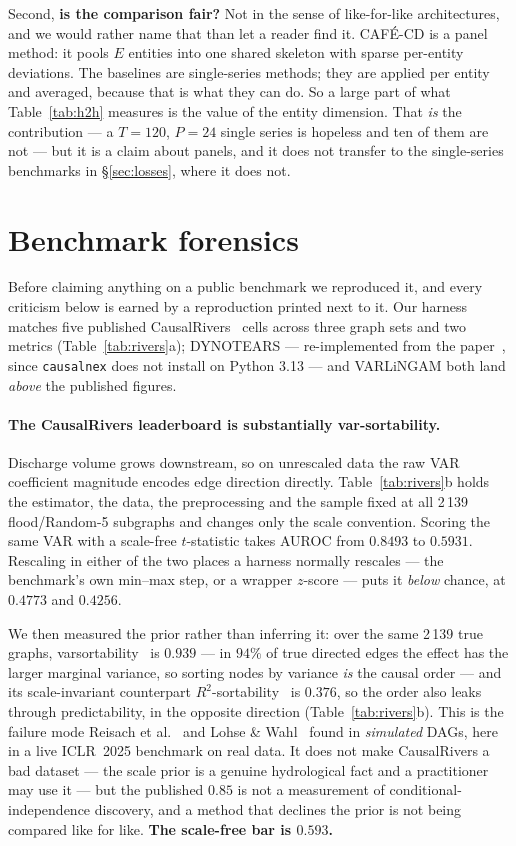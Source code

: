 \documentclass[10pt,twocolumn]{article}
\newcommand{\cafe}{CAF\'E}
\DeclareRobustCommand{\cd}{\cafe{}\nobreakdash-CD}
\begin{document}
Second, \textbf{is the comparison fair?} Not in the sense of like-for-like
architectures, and we would rather name that than let a reader find it. \cd{} is a
panel method: it pools $E$ entities into one shared skeleton with sparse per-entity
deviations. The baselines are single-series methods; they are applied per entity and
averaged, because that is what they can do. So a large part of what
Table~\ref{tab:h2h} measures is the value of the entity dimension. That \emph{is} the
contribution --- a $T{=}120$, $P{=}24$ single series is hopeless and ten of them are
not --- but it is a claim about panels, and it does not transfer to the single-series
benchmarks in \S\ref{sec:losses}, where it does not.

\section{Benchmark forensics}\label{sec:forensics}
Before claiming anything on a public benchmark we reproduced it, and every criticism
below is earned by a reproduction printed next to it. Our harness matches
five published CausalRivers~\cite{causalrivers} cells across three graph sets and two
metrics (Table~\ref{tab:rivers}a); DYNOTEARS --- re-implemented from the
paper~\cite{dynotears}, since \texttt{causalnex} does not install on Python 3.13 ---
and VARLiNGAM both land \emph{above} the published figures.




\paragraph{The CausalRivers leaderboard is substantially var-sortability.} Discharge
volume grows downstream, so on unrescaled data the raw VAR coefficient magnitude
encodes edge direction directly. Table~\ref{tab:rivers}b holds the estimator, the
data, the preprocessing and the sample fixed at all 2\,139 flood/Random-5 subgraphs and
changes only the scale convention. Scoring the same VAR with a scale-free $t$-statistic
takes AUROC from $0.8493$ to $0.5931$. Rescaling in either of the two places a harness
normally rescales --- the benchmark's own min--max step, or a wrapper $z$-score ---
puts it \emph{below} chance, at $0.4773$ and $0.4256$.

We then measured the prior rather than inferring it: over the same 2\,139 true graphs,
varsortability~\cite{reisach2021} is $0.939$ --- in $94\%$ of true directed edges the
effect has the larger marginal variance, so sorting nodes by variance \emph{is} the
causal order --- and its scale-invariant counterpart
$R^2$-sortability~\cite{reisach2023} is $0.376$, so the order also leaks through
predictability, in the opposite direction (Table~\ref{tab:rivers}b). This is the failure mode Reisach et al.~\cite{reisach2021} and Lohse \&
Wahl~\cite{lohse2024} found in \emph{simulated} DAGs, here in a live ICLR~2025
benchmark on real data. It does not make CausalRivers a bad dataset --- the scale prior
is a genuine hydrological fact and a practitioner may use it --- but the published
$0.85$ is not a measurement of conditional-independence discovery, and a method that
declines the prior is not being compared like for like. \textbf{The scale-free bar is
$0.593$.}
\end{document}
